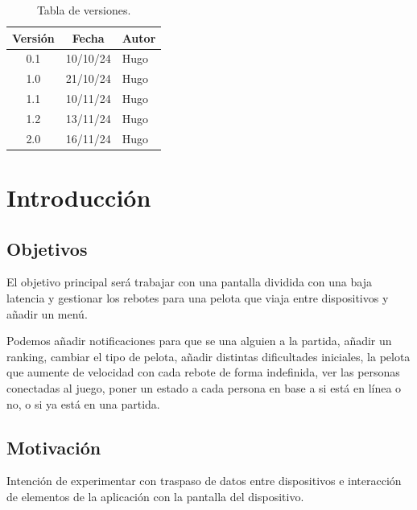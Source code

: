 \documentclass[a4paper,openright,12pt]{article}
\begin{document}

\tableofcontents

\vspace{5cm}

\begin{flushright}
\begin{table}[hbtp]
\begin{center}

\caption{Tabla de versiones.}
\label{tabla:versiones}
\small
\vspace{1ex}

\begin{tabular}{|c|c|l|}
\hline
Versión & Fecha & Autor \\
\hline \hline
0.1 & 10/10/24 & Hugo\\ \hline
1.0 & 21/10/24 & Hugo\\ \hline
1.1 & 10/11/24 & Hugo\\ \hline
1.2 & 13/11/24 & Hugo\\ \hline
2.0 & 16/11/24 & Hugo\\ \hline

\end{tabular}

\end{center}
\end{table}
\end{flushright}

\newpage
{}


\section{Introducción}\label{cap.introduccion}

\subsection{Objetivos}
El objetivo principal será trabajar con una pantalla dividida con una baja latencia y gestionar los rebotes para una pelota que viaja entre dispositivos y añadir un menú.

Podemos añadir notificaciones para que se una alguien a la partida, añadir un ranking, cambiar el tipo de pelota, añadir distintas dificultades iniciales, la pelota que aumente de velocidad con cada rebote de forma indefinida, ver las personas conectadas al juego, poner un estado a cada persona en base a si está en línea o no, o si ya está en una partida.
\subsection{Motivación}
Intención de experimentar con traspaso de datos entre dispositivos e interacción de elementos de la aplicación con la pantalla del dispositivo.
\end{document}
